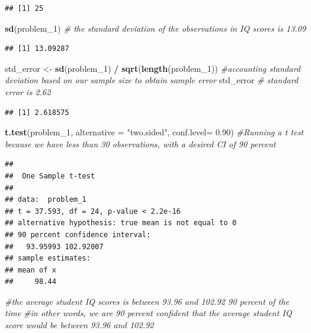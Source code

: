 \documentclass[]{article}
\newenvironment{Shaded}{\begin{snugshade}}{\end{snugshade}}
\newcommand{\CommentTok}[1]{\textcolor[rgb]{0.56,0.35,0.01}{\textit{#1}}}
\newcommand{\DataTypeTok}[1]{\textcolor[rgb]{0.13,0.29,0.53}{#1}}
\newcommand{\DecValTok}[1]{\textcolor[rgb]{0.00,0.00,0.81}{#1}}
\newcommand{\FloatTok}[1]{\textcolor[rgb]{0.00,0.00,0.81}{#1}}
\newcommand{\KeywordTok}[1]{\textcolor[rgb]{0.13,0.29,0.53}{\textbf{#1}}}
\newcommand{\NormalTok}[1]{#1}
\newcommand{\OperatorTok}[1]{\textcolor[rgb]{0.81,0.36,0.00}{\textbf{#1}}}
\newcommand{\StringTok}[1]{\textcolor[rgb]{0.31,0.60,0.02}{#1}}
\begin{document}
\begin{verbatim}
## [1] 25
\end{verbatim}

\begin{Shaded}
\begin{Highlighting}[]
\KeywordTok{sd}\NormalTok{(problem_}\DecValTok{1}\NormalTok{) }\CommentTok{# the standard deviation of the observations in IQ scores is 13.09}
\end{Highlighting}
\end{Shaded}

\begin{verbatim}
## [1] 13.09287
\end{verbatim}

\begin{Shaded}
\begin{Highlighting}[]
\NormalTok{std_error <-}\StringTok{ }\KeywordTok{sd}\NormalTok{(problem_}\DecValTok{1}\NormalTok{) }\OperatorTok{/}\StringTok{ }\KeywordTok{sqrt}\NormalTok{(}\KeywordTok{length}\NormalTok{(problem_}\DecValTok{1}\NormalTok{)) }\CommentTok{#accounting standard deviation based on our sample size to obtain sample error}
\NormalTok{std_error }\CommentTok{# standard error is 2.62}
\end{Highlighting}
\end{Shaded}

\begin{verbatim}
## [1] 2.618575
\end{verbatim}

\begin{Shaded}
\begin{Highlighting}[]
\KeywordTok{t.test}\NormalTok{(problem_}\DecValTok{1}\NormalTok{, }\DataTypeTok{alternative =} \StringTok{"two.sided"}\NormalTok{, }\DataTypeTok{conf.level=} \FloatTok{0.90}\NormalTok{) }\CommentTok{#Running a t test because we have less than 30 observations, with a desired CI of 90 percent}
\end{Highlighting}
\end{Shaded}

\begin{verbatim}
## 
##  One Sample t-test
## 
## data:  problem_1
## t = 37.593, df = 24, p-value < 2.2e-16
## alternative hypothesis: true mean is not equal to 0
## 90 percent confidence interval:
##   93.95993 102.92007
## sample estimates:
## mean of x 
##     98.44
\end{verbatim}

\begin{Shaded}
\begin{Highlighting}[]
\CommentTok{#the average student IQ scores is between 93.96 and 102.92 90 percent of the time}
\CommentTok{#in other words, we are 90 percent confident that the average student IQ score would be between 93.96 and 102.92}
\end{Highlighting}
\end{Shaded}
\end{document}
